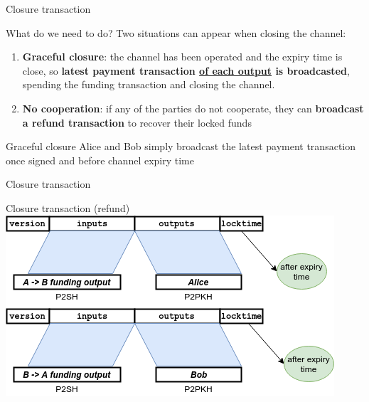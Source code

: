 \documentclass{beamer}
\begin{document}
\begin{frame}{Closure transaction}
 \begin{block}{What do we need to do?}
  Two situations can appear when closing the channel:
  \begin{enumerate}
   \item \textbf{Graceful closure}: the channel has been operated and the expiry time is close, so \textbf{latest payment transaction \underline{of each output} is broadcasted}, spending the funding transaction and closing the channel.
   \item \textbf{No cooperation}: if any of the parties do not cooperate, they can \textbf{broadcast a refund transaction} to recover their locked funds
  \end{enumerate}
 \end{block}
 \begin{exampleblock}{Graceful closure}
  Alice and Bob simply broadcast the latest payment transaction once signed and before channel expiry time
 \end{exampleblock}
\end{frame}
\begin{frame}{Closure transaction}
 \begin{exampleblock}{Closure transaction (refund)}
  \includegraphics[width=\textwidth, height=0.8\textheight, keepaspectratio]{img/bidir_tx_refund.png}
 \end{exampleblock}
\end{frame}
\end{document}
